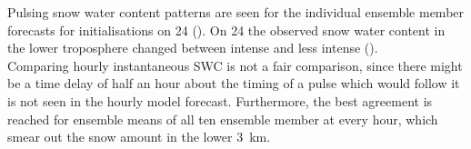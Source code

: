 Pulsing snow water content patterns are seen for the individual ensemble member forecasts for initialisations on \SI{24}{\dec} (). On \SI{24}{\dec} the observed snow water content in the lower troposphere changed between intense and less intense ().
\\
Comparing hourly instantaneous SWC is not a fair comparison, since there might be a time delay of half an hour about the timing of a pulse which would follow it is not seen in the hourly model forecast. Furthermore, the best agreement is reached for ensemble means of all ten ensemble member at every hour, which smear out the snow amount in the lower \SI{3}{\km}.
\par\medskip
